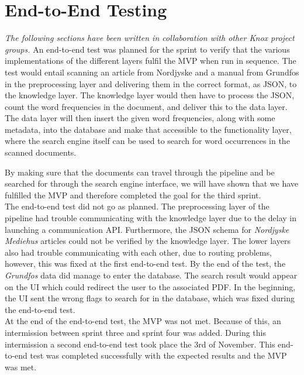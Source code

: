 \section{End-to-End Testing}\label{scrumofscrumendtotend}
\textit{The following sections have been written in collaboration with other Knox project groups.}
An end-to-end test was planned for the sprint to verify that the various implementations of the different layers fulfil the MVP when run in sequence. The test would entail scanning an article from Nordjyske and a manual from Grundfos in the preprocessing layer and delivering them in the correct format, as JSON, to the knowledge layer. The knowledge layer would then have to process the JSON, count the word frequencies in the document, and deliver this to the data layer. The data layer will then insert the given word frequencies, along with some metadata, into the database and make that accessible to the functionality layer, where the search engine itself can be used to search for word occurrences in the scanned documents.

By making sure that the documents can travel through the pipeline and be searched for through the search engine interface, we will have shown that we have fulfilled the MVP and therefore completed the goal for the third sprint.\\

The end-to-end test did not go as planned. The preprocessing layer of the pipeline had trouble communicating with the knowledge layer due to the delay in launching a communication API. Furthermore, the JSON schema for \textit{Nordjyske Mediehus} articles could not be verified by the knowledge layer.
The lower layers also had trouble communicating with each other, due to routing problems, however, this was fixed at the first end-to-end test. By the end of the test, the \textit{Grundfos} data did manage to enter the database. The search result would appear on the UI which could redirect the user to the associated PDF. In the beginning, the UI sent the wrong flags to search for in the database, which was fixed during the end-to-end test.\\

At the end of the end-to-end test, the MVP was not met. Because of this, an intermission between sprint three and sprint four was added. During this intermission a second end-to-end test took place the 3rd of November. This end-to-end test was completed successfully with the expected results and the MVP was met.